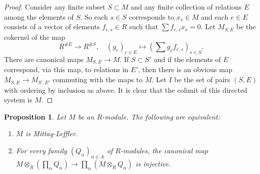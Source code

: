 \documentclass{amsart}
\theoremstyle{plain}
\newtheorem{proposition}[subsection]{Proposition}
\theoremstyle{definition}
\theoremstyle{remark}
\numberwithin{equation}{subsection}
\begin{document}
\begin{proof}
Consider any finite subset $S \subset M$ and any finite
collection of relations $E$ among the elements
of $S$. So each $s \in S$ corresponds to $x_s \in M$ and
each $e \in E$ consists of a vector
of elements $f_{e, s} \in R$ such that $\sum f_{e, s} x_s = 0$.
Let $M_{S, E}$ be the cokernel of the map
$$
R^{\# E} \longrightarrow R^{\# S}, \quad
(g_e)_{e\in E} \longmapsto (\sum g_e f_{e, s})_{s\in S}.
$$
There are canonical maps $M_{S, E} \to M$.
If $S \subset S'$ and if the elements of
$E$ correspond, via this map, to relations
in $E'$, then there is an obvious map
$M_{S, E} \to M_{S', E'}$ commuting with the
maps to $M$. Let $I$ be the set of pairs
$(S, E)$ with ordering by inclusion as above.
It is clear that the colimit of this directed system is $M$.
\end{proof}


\begin{proposition}
\label{proposition-ML-tensor}
Let $M$ be an $R$-module.  The following are equivalent:
\begin{enumerate}
\item $M$ is Mittag-Leffler.
\item For every family $(Q_{\alpha})_{\alpha \in A}$ of $R$-modules, the
canonical map $M \otimes_R \left( \prod_{\alpha} Q_{\alpha} \right)
\to \prod_{\alpha} (M \otimes_R Q_{\alpha})$ is injective.
\end{enumerate}
\end{proposition}
\end{document}
